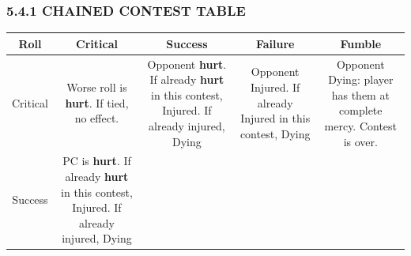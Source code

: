 \documentclass[
]{article}
\begin{document}
\hypertarget{chained-contest-table}{%
\subsubsection{5.4.1 CHAINED CONTEST
TABLE}\label{chained-contest-table}}

\begin{longtable}[]{@{}ccccc@{}}
\toprule
\begin{minipage}[b]{0.11\columnwidth}\centering
Roll\strut
\end{minipage} & \begin{minipage}[b]{0.19\columnwidth}\centering
Critical\strut
\end{minipage} & \begin{minipage}[b]{0.19\columnwidth}\centering
Success\strut
\end{minipage} & \begin{minipage}[b]{0.19\columnwidth}\centering
Failure\strut
\end{minipage} & \begin{minipage}[b]{0.19\columnwidth}\centering
Fumble\strut
\end{minipage}\tabularnewline
\midrule
\endhead
\begin{minipage}[t]{0.11\columnwidth}\centering
Critical\strut
\end{minipage} & \begin{minipage}[t]{0.19\columnwidth}\centering
Worse roll is \textbf{hurt}. If tied, no effect.\strut
\end{minipage} & \begin{minipage}[t]{0.19\columnwidth}\centering
Opponent \textbf{hurt}. If already \textbf{hurt} in this contest,
Injured. If already injured, Dying\strut
\end{minipage} & \begin{minipage}[t]{0.19\columnwidth}\centering
Opponent Injured. If already Injured in this contest, Dying\strut
\end{minipage} & \begin{minipage}[t]{0.19\columnwidth}\centering
Opponent Dying: player has them at complete mercy. Contest is
over.\strut
\end{minipage}\tabularnewline
\begin{minipage}[t]{0.11\columnwidth}\centering
Success\strut
\end{minipage} & \begin{minipage}[t]{0.19\columnwidth}\centering
PC is \textbf{hurt}. If already \textbf{hurt} in this contest, Injured.
If already injured, Dying\strut

\end{minipage}
\end{longtable}
\end{document}
